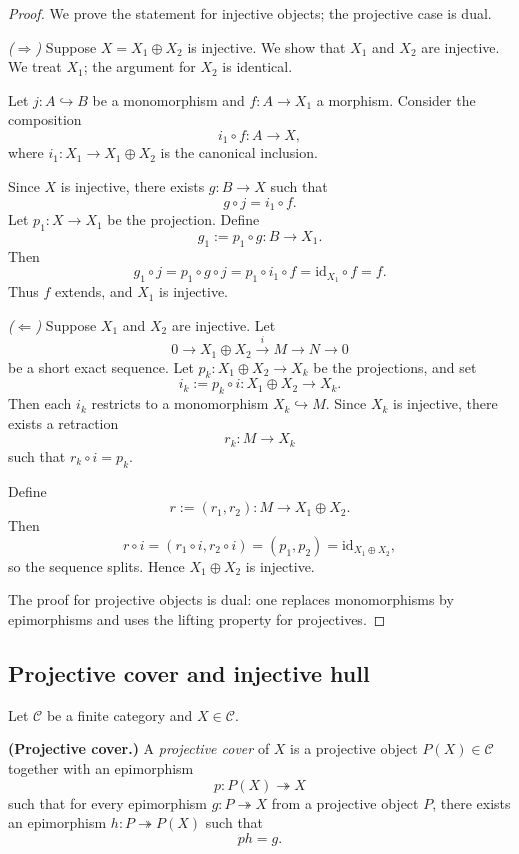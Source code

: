 \documentclass[11pt]{article}
\newcommand{\C}{\mathcal{C}}
\theoremstyle{definition}
\begin{document}
\begin{proof}
We prove the statement for injective objects; the projective case is dual.

\medskip

\noindent
\emph{($\Rightarrow$)} Suppose $X = X_1 \oplus X_2$ is injective. We show that $X_1$ and $X_2$ are injective. We treat $X_1$; the argument for $X_2$ is identical.

Let $j: A \hookrightarrow B$ be a monomorphism and $f: A \to X_1$ a morphism. Consider the composition
\[
i_1 \circ f: A \to X,
\]
where $i_1: X_1 \to X_1 \oplus X_2$ is the canonical inclusion.

Since $X$ is injective, there exists $g: B \to X$ such that
\[
g \circ j = i_1 \circ f.
\]
Let $p_1: X \to X_1$ be the projection. Define
\[
g_1 := p_1 \circ g: B \to X_1.
\]
Then
\[
g_1 \circ j = p_1 \circ g \circ j = p_1 \circ i_1 \circ f = \mathrm{id}_{X_1} \circ f = f.
\]
Thus $f$ extends, and $X_1$ is injective.

\medskip

\emph{($\Leftarrow$)} Suppose $X_1$ and $X_2$ are injective. Let
\[
0 \to X_1 \oplus X_2 \xrightarrow{i} M \to N \to 0
\]
be a short exact sequence. Let $p_k: X_1 \oplus X_2 \to X_k$ be the projections, and set
\[
i_k := p_k \circ i: X_1 \oplus X_2 \to X_k.
\]
Then each $i_k$ restricts to a monomorphism $X_k \hookrightarrow M$. Since $X_k$ is injective, there exists a retraction
\[
r_k: M \to X_k
\]
such that $r_k \circ i = p_k$.

Define
\[
r := (r_1, r_2): M \to X_1 \oplus X_2.
\]
Then
\[
r \circ i = (r_1 \circ i, r_2 \circ i) = (p_1, p_2) = \mathrm{id}_{X_1 \oplus X_2},
\]
so the sequence splits. Hence $X_1 \oplus X_2$ is injective.

\medskip


The proof for projective objects is dual: one replaces monomorphisms by epimorphisms and uses the lifting property for projectives.
\end{proof}



\subsection{Projective cover and injective hull}


Let $\C$ be a finite category and  $X \in \mathcal{C}$.

\smallskip
\noindent \textbf{(Projective cover.)} A \emph{projective cover} of $X$ is a projective object $P(X) \in \mathcal{C}$ together with an epimorphism
\[
p \colon P(X) \twoheadrightarrow X
\]
such that for every epimorphism $g \colon P \twoheadrightarrow X$ from a projective object $P$, there exists an epimorphism $h \colon P \twoheadrightarrow P(X)$ such that
\[
p h = g.
\]
\end{document}
